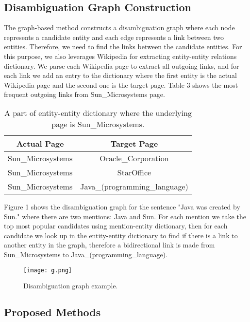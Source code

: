 \documentclass{llncs}
\begin{document}
 \subsection{Disambiguation Graph Construction}
 The graph-based method constructs a  disambiguation graph  where each node represents a candidate entity and each edge represents a link between two entities. Therefore, we need  to find the links between the candidate entities. For this purpose, we also leverages Wikipedia for extracting entity-entity relations dictionary. We parse each Wikipedia page to extract all outgoing links, and for each link we add an entry to the dictionary where the first entity is the actual Wikipedia page and the second one is the target page.  Table 3 shows the most frequent outgoing links from Sun\_Microsystems page.
  \begin{table}[th!]
\centering
\begin{tabular}{|c|c|}
\hline
Actual Page & Target Page \\
\hline
 Sun\_Microsystems  & Oracle\_Corporation                                                                            \\
 Sun\_Microsystems  & StarOffice                                                           \\
 Sun\_Microsystems  & Java\_(programming\_language)                                                       \\
\hline
\end{tabular}
\caption{A part of entity-entity dictionary where the underlying page is Sun\_Microsystems. }
\end{table}

Figure 1 shows the disambiguation graph for the sentence "Java was created by Sun." where there are two mentions: Java and Sun. For each mention we take the top most popular candidates using mention-entity dictionary, then for each candidate we look up in the entity-entity dictionary to find if there is a link to another  entity in the graph, therefore a bidirectional link is made from Sun\_Microsystems to Java\_(programming\_language).  

 \begin{figure}
 \centering
\texttt{[image: g.png]}
\caption{Disambiguation graph example.}
\label{Tux}
\end{figure}

 \subsection{Proposed Methods}
 
\end{document}
